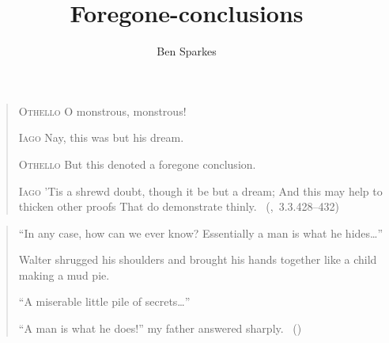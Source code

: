 \documentclass[10pt]{report}
\title{
  Foregone-conclusions
}
\author{Ben Sparkes}
\begin{document}
\nocite{Lewis:1973aa}


\maketitle

\begin{quote}
  \textsc{Othello} O monstrous, monstrous!

  \textsc{Iago}\phantom{O monstrous, monstrous! Nay,} Nay, this was but his dream.

  \textsc{Othello} But this denoted a foregone conclusion.

  \textsc{Iago} 'Tis a shrewd doubt, though it be but a dream;\newline
  And this may help to thicken other proofs\newline
  That do demonstrate thinly.\newline
  \mbox{ }\hfill\mbox{(, 3.3.428--432)}
\end{quote}

\vfill

\begin{quote}
  ``In any case, how can we ever know? Essentially a man is what he hides\dots''

  Walter shrugged his shoulders and brought his hands together like a child making a mud pie.

  ``A miserable little pile of secrets\dots''

  ``A man is what he does!'' my father answered sharply.\newline
  \mbox{ }\hfill\mbox{(\cite[20]{Malraux:1968aa})}
\end{quote}

\tableofcontents

\newpage

\setcounter{chapter}{-1}

% 






% 


\end{document}

